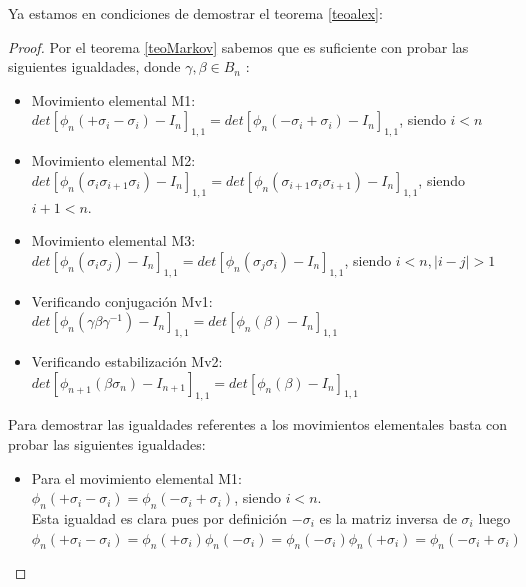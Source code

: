 \documentclass[14pt]{extarticle}
\begin{document}
 \bigskip
 Ya estamos en condiciones de demostrar el teorema \ref{teoalex}:
 \begin{proof}
 	Por el teorema \ref{teoMarkov} sabemos que es suficiente con probar las siguientes igualdades, donde $ \gamma, \beta \in B_{n} $ :
 	\begin{itemize}
 		\item Movimiento elemental M1: \\
 		$ det[\phi_{n}(+\sigma_{i}-\sigma_{i}) - I_{n}]_{1,1} = det[\phi_{n}(-\sigma_{i}+\sigma_{i}) - I_{n}]_{1,1}$, siendo $i<n$
 		\item Movimiento elemental M2: \\
 		$ det[\phi_{n}(\sigma_{i}\sigma_{i+1}\sigma_{i}) - I_{n}]_{1,1} = det[\phi_{n}(\sigma_{i+1}\sigma_{i}\sigma_{i+1}) - I_{n}]_{1,1}$, siendo $ i+1<n $.
 		\item Movimiento elemental M3:\\
 		$ det[\phi_{n}(\sigma_{i}\sigma_{j}) - I_{n}]_{1,1} = det[\phi_{n}(\sigma_{j}\sigma_{i}) - I_{n}]_{1,1}$, siendo $i<n, |i-j| > 1$
 		\item Verificando conjugación Mv1: $ det[\phi_{n}(\gamma\beta\gamma^{-1}) - I_{n}]_{1,1} = det[\phi_{n}(\beta) - I_{n}]_{1,1}$ 
 		\item Verificando estabilización Mv2: $ det[\phi_{n+1}(\beta\sigma_{n}) - I_{n+1}]_{1,1} = det[\phi_{n}(\beta) - I_{n}]_{1,1}$   
  	\end{itemize}
	 Para demostrar las igualdades referentes a los movimientos elementales basta con probar las siguientes igualdades:
	 \begin{itemize}
	 	 \item Para el movimiento elemental M1: \\
	 	 $ \phi_{n}(+\sigma_{i}-\sigma_{i}) = \phi_{n}(-\sigma_{i}+\sigma_{i})$, siendo $i<n$.\\
	 	 Esta igualdad es clara pues por definición $-\sigma_{i}$ es la matriz inversa de $\sigma_{i}$  luego $ \phi_{n}(+\sigma_{i}-\sigma_{i}) = \phi_{n}(+\sigma_{i})\phi_n(-\sigma_{i}) = \phi_{n}(-\sigma_{i})\phi_n(+\sigma_{i}) = \phi_{n}(-\sigma_{i}+\sigma_{i})$
	 	 

\end{itemize}
\end{proof}
\end{document}
